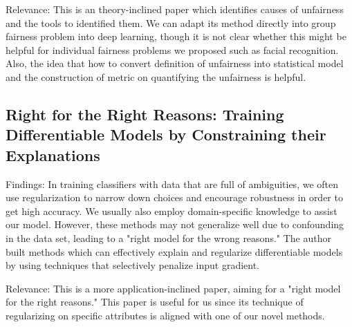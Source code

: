 \noindent Relevance: This is an theory-inclined paper which identifies causes of unfairness and the tools to identified them. We can adapt its method directly into group fairness problem into deep learning, though it is not clear whether this might be helpful for individual fairness problems we proposed such as facial recognition. Also, the idea that how to convert definition of unfairness into statistical model and the construction of metric on quantifying the unfairness is helpful.

\subsection{Right for the Right Reasons: Training Differentiable Models by Constraining their Explanations \cite{ijcai2017-371}} 
Findings: In training classifiers with data that are full of ambiguities, we often use regularization to narrow down choices and encourage robustness in order to get high accuracy. We usually also employ domain-specific knowledge to assist our model. However, these methods may not generalize well due to confounding in the data set, leading to a "right model for the wrong reasons." The author built methods which can effectively explain and regularize differentiable models by using techniques that selectively penalize input gradient.

\noindent Relevance: This is a more application-inclined paper, aiming for a "right model for the right reasons." This paper is useful for us since its technique of regularizing on specific attributes is aligned with one of our novel methods.